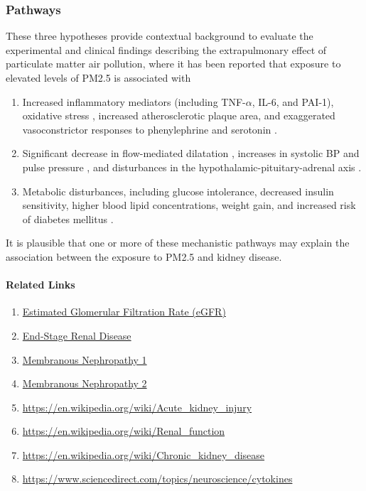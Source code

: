 \documentclass[11pt]{article}
\begin{document}
\subsubsection{Pathways}

 These three hypotheses provide contextual background to evaluate the experimental and clinical findings describing the extrapulmonary effect of particulate matter air pollution, where it has been reported that exposure to elevated levels of PM2.5 is associated with \citep{bowe2018particulate}
 \begin{enumerate}
     \item Increased inflammatory mediators (including TNF-$\alpha$, IL-6, and PAI-1), oxidative stress \citep{ostro2014chronic, ruckerl2014associations, sorensen2003personal}, increased atherosclerotic plaque area, and exaggerated vasoconstrictor responses to phenylephrine and serotonin \citep{sun2005long}.
     \item Significant decrease in flow-mediated dilatation \citep{krishnan2012vascular, wilker2014relation}, increases in systolic BP and pulse pressure \citep{auchincloss2008associations, fuks2014arterial, fuks2011long}, and disturbances in the hypothalamic-pituitary-adrenal axis \citep{thomson2013mapping}.
     \item  Metabolic disturbances, including glucose intolerance, decreased insulin sensitivity, higher blood lipid concentrations, weight gain, and increased risk of diabetes mellitus \citep{wei2016chronic, chen2016ambient, wolf2016association}.
 \end{enumerate}
 
It is plausible that one or more of these mechanistic pathways may explain the association between the exposure to PM2.5 and kidney disease.

\paragraph{Related Links}

\begin{enumerate}
    \item \href{https://labtestsonline.org/tests/estimated-glomerular-filtration-rate-egfr}{Estimated Glomerular Filtration Rate (eGFR)}
    \item \href{https://www.mayoclinic.org/diseases-conditions/end-stage-renal-disease/symptoms-causes/syc-20354532}{End-Stage Renal Disease}
    \item \href{https://unckidneycenter.org/kidneyhealthlibrary/glomerular-disease/membranous-nephropathy/}{Membranous Nephropathy 1}
    \item \href{https://www.mayoclinic.org/diseases-conditions/membranous-nephropathy/symptoms-causes/syc-20365189}{Membranous Nephropathy 2}
    \item \url{https://en.wikipedia.org/wiki/Acute_kidney_injury}
    \item \url{https://en.wikipedia.org/wiki/Renal_function}
    \item \url{https://en.wikipedia.org/wiki/Chronic_kidney_disease}
    \item \url{https://www.sciencedirect.com/topics/neuroscience/cytokines}
\end{enumerate}




\end{document}
